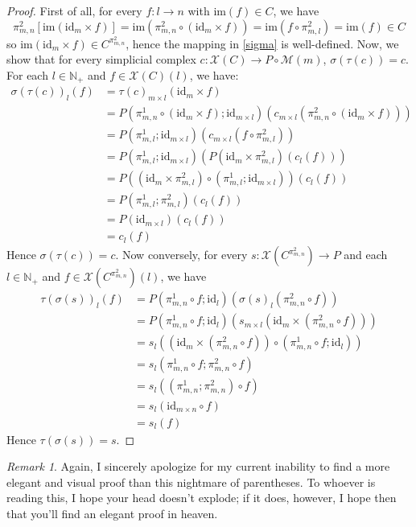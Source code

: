 \documentclass{article}
\theoremstyle{remark}
\newtheorem{remark}{Remark}[subsection]
\theoremstyle{definition}
\newcommand{\N}{\mathbb N}
\newcommand{\im}{\mathrm{im}}
\newcommand{\id}{\mathrm{id}}
\newcommand{\X}{\mathcal X}
\newcommand{\M}{\mathcal M}
\begin{document}
	\begin{proof}
		First of all, for every $f:l\to n$ with $\im(f)\in C$, we have
		\[\pi^2_{m,n}[\im(\id_m\times f)]=\im(\pi^2_{m,n}\circ(\id_m\times f))=\im(f\circ\pi^2_{m,l})=\im(f)\in C\]
		so $\im(\id_m\times f)\in C^{\pi^2_{m,n}}$, hence the mapping in \ref{sigma} is well-defined.
		Now, we show that for every simplicial complex $c:\X(C)\to P\circ\M(m)$, $\sigma(\tau(c))=c$. For each $l\in\N_+$ and $f\in\X(C)(l)$, we have:
		\begin{align*}
			\sigma(\tau(c))_l(f)&=\tau(c)_{m\times l}(\id_m\times f)\\
			&=P(\pi^1_{m,n}\circ(\id_m\times f);\id_{m\times l})(c_{m\times l}(\pi^2_{m,n}\circ(\id_m\times f)))\\
			&=P(\pi^1_{m,l};\id_{m\times l})(c_{m\times l}(f\circ\pi^2_{m,l}))\\
			&=P(\pi^1_{m,l};\id_{m\times l})(P(\id_m\times\pi^2_{m,l})(c_l(f)))\\
			&=P((\id_m\times\pi^2_{m,l})\circ(\pi^1_{m,l};\id_{m\times l}))(c_l(f))\\
			&=P(\pi^1_{m,l};\pi^2_{m,l})(c_l(f))\\
			&=P(\id_{m\times l})(c_l(f))\\
			&=c_l(f)
		\end{align*}
		Hence $\sigma(\tau(c))=c$. Now conversely, for every $s:\X(C^{\pi^2_{m,n}})\to P$ and each $l\in\N_+$ and $f\in\X(C^{\pi^2_{m,n}})(l)$, we have
		\begin{align*}
			\tau(\sigma(s))_l(f)&=P(\pi^1_{m,n}\circ f;\id_l)(\sigma(s)_l(\pi^2_{m,n}\circ f))\\
			&=P(\pi^1_{m,n}\circ f;\id_l)(s_{m\times l}(\id_m\times(\pi^2_{m,n}\circ f)))\\
			&=s_l((\id_m\times(\pi^2_{m,n}\circ f))\circ(\pi^1_{m,n}\circ f;\id_l))\\
			&=s_l(\pi^1_{m,n}\circ f;\pi^2_{m,n}\circ f)\\
			&=s_l((\pi^1_{m,n};\pi^2_{m,n})\circ f)\\
			&=s_l(\id_{m\times n}\circ f)\\
			&=s_l(f)
		\end{align*}
		Hence $\tau(\sigma(s))=s$.
	\end{proof}
	\begin{remark}
		Again, I sincerely apologize for my current inability to find a more elegant and visual proof than this nightmare of parentheses. To whoever is reading this, I hope your head doesn't explode; if it does, however, I hope then that you'll find an elegant proof in heaven.
	\end{remark}
\end{document}
